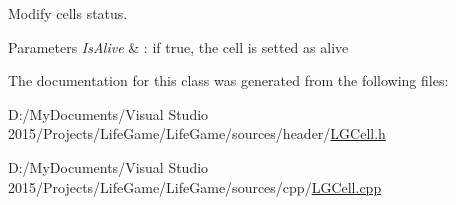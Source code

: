 Modify cell\textquotesingle{}s status. 


\begin{DoxyParams}{Parameters}
{\em Is\+Alive} & \+: if true, the cell is setted as alive \\
\hline
\end{DoxyParams}


The documentation for this class was generated from the following files\+:\begin{DoxyCompactItemize}
\item 
D\+:/\+My\+Documents/\+Visual Studio 2015/\+Projects/\+Life\+Game/\+Life\+Game/sources/header/\hyperlink{_l_g_cell_8h}{L\+G\+Cell.\+h}\item 
D\+:/\+My\+Documents/\+Visual Studio 2015/\+Projects/\+Life\+Game/\+Life\+Game/sources/cpp/\hyperlink{_l_g_cell_8cpp}{L\+G\+Cell.\+cpp}\end{DoxyCompactItemize}
